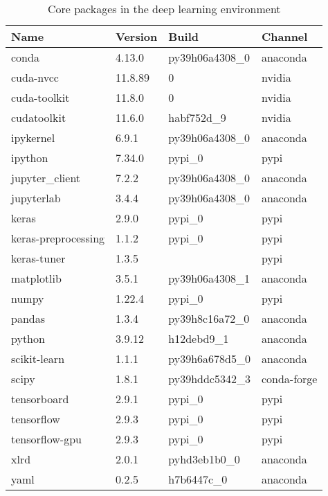 \begin{table}[h]
  \centering
  \begin{tabular}{llll}
    \hline
    Name                & Version & Build          & Channel     \\
    \hline
    conda               & 4.13.0  & py39h06a4308_0 & anaconda    \\
    cuda-nvcc           & 11.8.89 & 0              & nvidia      \\
    cuda-toolkit        & 11.8.0  & 0              & nvidia      \\
    cudatoolkit         & 11.6.0  & habf752d_9     & nvidia      \\
    ipykernel           & 6.9.1   & py39h06a4308_0 & anaconda    \\
    ipython             & 7.34.0  & pypi_0         & pypi        \\
    jupyter\_client     & 7.2.2   & py39h06a4308_0 & anaconda    \\
    jupyterlab          & 3.4.4   & py39h06a4308_0 & anaconda    \\
    keras               & 2.9.0   & pypi_0         & pypi        \\
    keras-preprocessing & 1.1.2   & pypi_0         & pypi        \\
    keras-tuner         & 1.3.5   &                & pypi        \\
    matplotlib          & 3.5.1   & py39h06a4308_1 & anaconda    \\
    numpy               & 1.22.4  & pypi_0         & pypi        \\
    pandas              & 1.3.4   & py39h8c16a72_0 & anaconda    \\
    python              & 3.9.12  & h12debd9_1     & anaconda    \\
    scikit-learn        & 1.1.1   & py39h6a678d5_0 & anaconda    \\
    scipy               & 1.8.1   & py39hddc5342_3 & conda-forge \\
    tensorboard         & 2.9.1   & pypi_0         & pypi        \\
    tensorflow          & 2.9.3   & pypi_0         & pypi        \\
    tensorflow-gpu      & 2.9.3   & pypi_0         & pypi        \\
    xlrd                & 2.0.1   & pyhd3eb1b0_0   & anaconda    \\
    yaml                & 0.2.5   & h7b6447c_0     & anaconda    \\
    \hline
  \end{tabular}
  \caption{Core packages in the deep learning environment}
  \label{si_table19}
\end{table}


